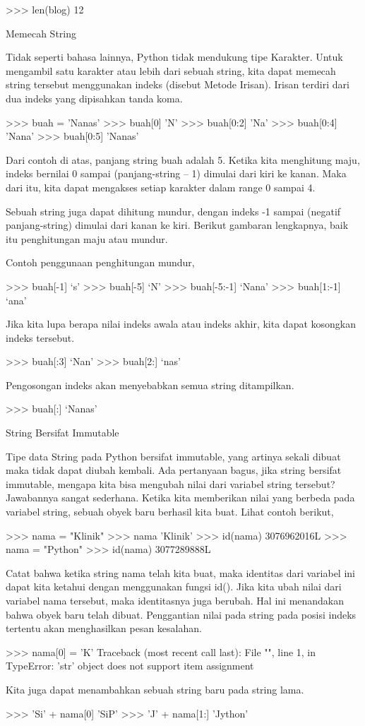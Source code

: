 >>> len(blog)
12

Memecah String

Tidak seperti bahasa lainnya, Python tidak mendukung tipe Karakter. Untuk mengambil satu karakter atau lebih dari sebuah string, kita dapat memecah string tersebut menggunakan indeks (disebut Metode Irisan). Irisan terdiri dari dua indeks yang dipisahkan tanda koma.

>>> buah = 'Nanas'
>>> buah[0]
'N'
>>> buah[0:2]
'Na'
>>> buah[0:4]
'Nana'
>>> buah[0:5]
'Nanas'

Dari contoh di atas, panjang string buah adalah 5. Ketika kita menghitung maju, indeks bernilai 0 sampai (panjang-string – 1) dimulai dari kiri ke kanan. Maka dari itu, kita dapat mengakses setiap karakter dalam range 0 sampai 4.

Sebuah string juga dapat dihitung mundur, dengan indeks -1 sampai (negatif panjang-string) dimulai dari kanan ke kiri. Berikut gambaran lengkapnya, baik itu penghitungan maju atau mundur.

Contoh penggunaan penghitungan mundur,

>>> buah[-1]
‘s’
>>> buah[-5]
‘N’
>>> buah[-5:-1]
‘Nana’
>>> buah[1:-1]
‘ana’

Jika kita lupa berapa nilai indeks awala atau indeks akhir, kita dapat kosongkan indeks tersebut.

>>> buah[:3]
‘Nan’
>>> buah[2:]
‘nas’

Pengosongan indeks akan menyebabkan semua string ditampilkan.

>>> buah[:]
‘Nanas’

String Bersifat Immutable

Tipe data String pada Python bersifat immutable, yang artinya sekali dibuat maka tidak dapat diubah kembali. Ada pertanyaan bagus, jika string bersifat immutable, mengapa kita bisa mengubah nilai dari variabel string tersebut? Jawabannya sangat sederhana. Ketika kita memberikan nilai yang berbeda pada variabel string, sebuah obyek baru berhasil kita buat. Lihat contoh berikut,

>>> nama = "Klinik"
>>> nama
'Klinik'
>>> id(nama)
3076962016L
>>> nama = "Python"
>>> id(nama)
3077289888L

Catat bahwa ketika string nama telah kita buat, maka identitas dari variabel ini dapat kita ketahui dengan menggunakan fungsi id(). Jika kita ubah nilai dari variabel nama tersebut, maka identitasnya juga berubah. Hal ini menandakan bahwa obyek baru telah dibuat. Penggantian nilai pada string pada posisi indeks tertentu akan menghasilkan pesan kesalahan.

>>> nama[0] = 'K'
Traceback (most recent call last):
File "", line 1, in
TypeError: 'str' object does not support item assignment

Kita juga dapat menambahkan sebuah string baru pada string lama.

>>> 'Si' + nama[0]
'SiP'
>>> 'J' + nama[1:]
'Jython'

